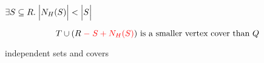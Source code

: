 \begin{frame}{}
  \begin{center}

    \pause

    \pause
    \vspace{0.30cm}
    $\exists S \subseteq R.\; \Big\lvert N_{H}(S) \Big\rvert < \Big\lvert S \Big\rvert$

    \pause
    \[
      T \cup (R \;\textcolor{red}{-\; S + N_{H}(S)}) \text{ is a smaller vertex cover than } Q
    \]
  \end{center}
\end{frame}

\begin{frame}{}
  independent sets and covers
\end{frame}
